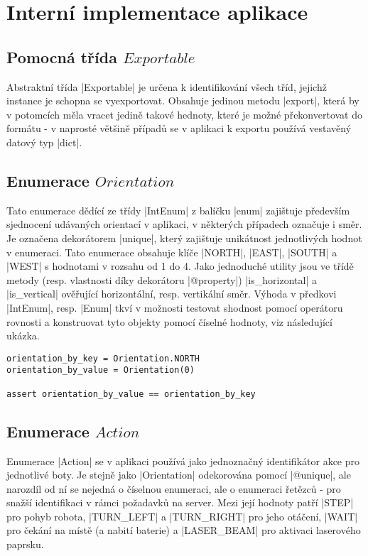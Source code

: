 \section{Interní implementace aplikace}
\label{sec:implementation}

\subsection{Pomocná třída $Exportable$}

Abstraktní třída \ic|Exportable| je určena k identifikování všech tříd, jejichž instance je schopna se vyexportovat. Obsahuje jedinou metodu \ic|export|, která by v potomcích měla vracet jedině takové hednoty, které je možné překonvertovat do formátu  - v naprosté většině případů se v aplikaci k exportu používá vestavěný datový typ \ic|dict|.

\subsection{Enumerace $Orientation$}

Tato enumerace dědící ze třídy \ic|IntEnum| z balíčku \ic|enum| zajištuje především sjednocení udávaných orientací v aplikaci, v některých případech označuje i směr. Je označena dekorátorem \ic|unique|, který zajištuje unikátnost jednotlivých hodnot v enumeraci. Tato enumerace obsahuje klíče \ic|NORTH|, \ic|EAST|, \ic|SOUTH| a \ic|WEST| s hodnotami v rozsahu od 1 do 4. Jako jednoduché utility jsou ve třídě metody (resp. vlastnosti díky dekorátoru \ic|@property|) \ic|is_horizontal| a \ic|is_vertical| ověřující horizontální, resp. vertikální směr. Výhoda v předkovi \ic|IntEnum|, resp. \ic|Enum| tkví v možnosti testovat shodnost pomocí operátoru rovnosti a konstruovat tyto objekty pomocí číselné hodnoty, viz následující ukázka.

\begin{lstlisting}[caption={Výhody třídy $Enum$}]
orientation_by_key = Orientation.NORTH
orientation_by_value = Orientation(0)

assert orientation_by_value == orientation_by_key
\end{lstlisting}

\subsection{Enumerace $Action$}
\label{subsec:action-enum}
Enumerace \ic|Action| se v aplikaci používá jako jednoznačný identifikátor akce pro jednotlivé boty. Je stejně jako \ic|Orientation| odekorována pomocí \ic|@unique|, ale narozdíl od ní se nejedná o číselnou enumeraci, ale o enumeraci řetězců - pro snažší identifikaci v rámci požadavků na server.
Mezi její hodnoty patří \ic|STEP| pro pohyb robota, \ic|TURN_LEFT| a \ic|TURN_RIGHT| pro jeho otáčení, \ic|WAIT| pro čekání na místě (a nabití baterie) a \ic|LASER_BEAM| pro aktivaci laserového paprsku.

